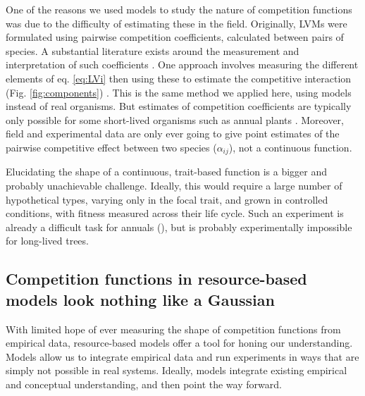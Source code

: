 \documentclass[a4paper,11pt]{article}
\begin{document}
One of the reasons we used models to study the nature of competition functions was due to the difficulty of estimating these in the field. Originally, LVMs were formulated using pairwise competition coefficients, calculated between pairs of species. A substantial literature exists around the measurement and interpretation of such coefficients \citep[e.g.]{Ricklefs-1973, Abrams-1980, Law-1997a,Freckleton-2001, Kraft-2015}. One approach involves measuring the different elements of eq. \ref{eq:LVi} then using these to estimate the competitive interaction (Fig. \ref{fig:components}) \citet{Ricklefs-1973}. This is the same method we applied here, using models instead of real organisms. But estimates of competition coefficients are typically only possible for some short-lived organisms such as annual plants \citep{Kraft-2015, Mayfield-2017, Law-1997,Freckleton-2001}. Moreover, field and experimental data are only ever going to give point estimates of the pairwise competitive effect between two species ($\alpha_{ij}$), not a continuous function. 

Elucidating the shape of a continuous, trait-based function is a bigger and probably unachievable challenge. Ideally, this would require a large number of hypothetical types, varying only in the focal trait, and grown in controlled conditions, with fitness measured across their life cycle. Such an experiment is already a difficult task for annuals (\citep{Kraft-2015}), but is probably experimentally impossible for long-lived trees.

\subsection{Competition functions in resource-based models look nothing like a  Gaussian}

With limited hope of ever measuring the shape of competition functions from empirical data, resource-based models offer a tool for honing our understanding. Models allow us to integrate empirical data and run experiments in ways that are simply not possible in real systems. Ideally, models integrate existing empirical and conceptual understanding, and then point the way forward.
\end{document}
